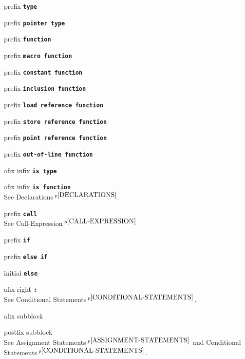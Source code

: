 \documentclass[12pt]{article}
\newcommand{\TT}[1]{{\tt \bfseries #1}}
\newcommand{\pagnote}[1]{$\,^{p\pageref{#1}}$}
\newenvironment{itemlist}[1][1.2in]%
	{\begin{list}{}{\setlength{\labelwidth}{#1}%
		        \setlength{\leftmargin}{\labelwidth}%
		        \addtolength{\leftmargin}{+0.2in}%
		        \renewcommand{\makelabel}[1]{##1\hfill}}}%
	{\end{list}}
\begin{document}
\begin{itemlist}[0.2in]
\item[prefix \TT{type}]
\item[prefix \TT{pointer type}] \vspace*{-0.15in}
\item[prefix \TT{function}] \vspace*{-0.15in}
\item[prefix \TT{macro function}] \vspace*{-0.15in}
\item[prefix \TT{constant function}] \vspace*{-0.15in}
\item[prefix \TT{inclusion function}] \vspace*{-0.15in}
\item[prefix \TT{load reference function}] \vspace*{-0.15in}
\item[prefix \TT{store reference function}] \vspace*{-0.15in}
\item[prefix \TT{point reference function}] \vspace*{-0.15in}
\item[prefix \TT{out-of-line function}] \vspace*{-0.15in}
\item[afix infix \TT{is type}] \vspace*{-0.15in}
\item[afix infix \TT{is function}] \vspace*{-0.15in} ~\\
See Declarations\pagnote{DECLARATIONS}.

\item[prefix \TT{call}] ~\\
See Call-Expression\pagnote{CALL-EXPRESSION}

\item[prefix \TT{if}]
\item[prefix \TT{else if}] \vspace*{-0.15in}
\item[initial \TT{else}] \vspace*{-0.15in}
\item[afix right \TT{:}] \vspace*{-0.15in} ~\\
See Conditional Statements\pagnote{CONDITIONAL-STATEMENTS}.

\item[afix subblock]
\item[postfix subblock] \vspace*{-0.15in} ~\\
See Assignment Statements\pagnote{ASSIGNMENT-STATEMENTS}
and Conditional Statements\pagnote{CONDITIONAL-STATEMENTS}.


\end{itemlist}
\end{document}
